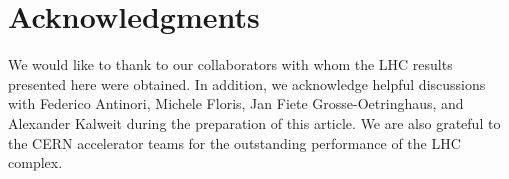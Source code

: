 \section*{Acknowledgments}

We would like to thank to our collaborators with whom the LHC results presented here were obtained. In addition, we acknowledge helpful discussions with Federico Antinori, Michele Floris, Jan Fiete Grosse-Oetringhaus, and Alexander Kalweit during the preparation of this article. We are also grateful to the CERN accelerator teams for the outstanding performance of the LHC complex.

